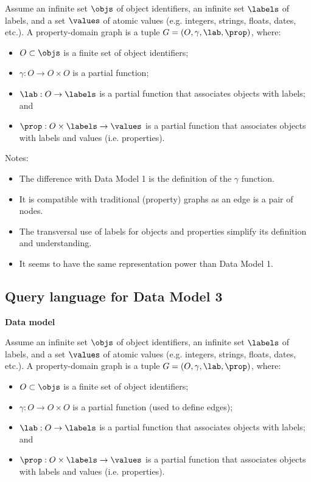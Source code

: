 Assume an infinite set $\objs$ of object identifiers, an infinite set $\labels$ of labels, and a set $\values$ of atomic values  (e.g. integers, strings, floats, dates, etc.). 
A property-domain graph is a tuple $G=(O,\gamma,\lab,\prop)$, where:
\begin{itemize}
\item $O \subset \objs$ is a finite set of object identifiers;
\item $\gamma : O \to O \times O$ is a partial function; 
\item $\lab : O \to \labels$ is a partial function that associates objects with labels; and
\item $\prop : O \times \labels \to \values$ is a partial function that associates objects with labels and values (i.e. properties).
\end{itemize}

Notes:
\begin{itemize}
\item The difference with Data Model 1 is the definition of the $\gamma$ function.
\item It is compatible with traditional (property) graphs as an edge is a pair of nodes.
\item The transversal use of labels for objects and properties simplify its definition and understanding.
\item It seems to have the same representation power than Data Model 1.  
\end{itemize}


\subsection{Query language for Data Model 3}
\label{sec-op1}

\smallskip
\noindent
\textbf{Data model}

Assume an infinite set $\objs$ of object identifiers, an infinite set $\labels$ of labels, and a set $\values$ of atomic values  (e.g. integers, strings, floats, dates, etc.). 
 A property-domain graph is a tuple $G=(O,\gamma,\lab,\prop)$, where:
\begin{itemize}
\item $O \subset \objs$ is a finite set of object identifiers;
\item $\gamma : O \to O \times O$ is a partial function (used to define edges); 
\item $\lab : O \to \labels$ is a partial function that associates objects with labels; and
\item $\prop : O \times \labels \to \values$ is a partial function that associates objects with labels and values (i.e. properties).
\end{itemize}

